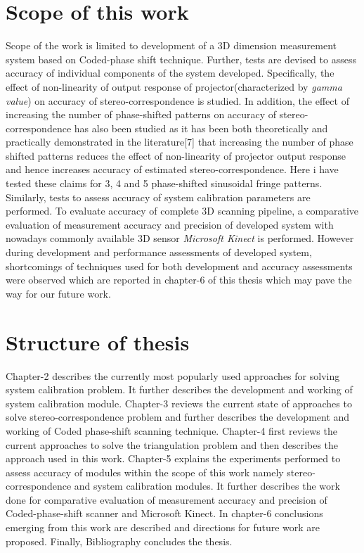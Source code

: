  
 
\section{Scope of this work} 
Scope of the work is limited to development of a 3D dimension measurement system based on Coded-phase shift technique. Further, tests are devised to assess accuracy of individual components of the system developed. Specifically, the effect of non-linearity of output response of projector(characterized by \textit{gamma value}) on accuracy of stereo-correspondence is studied. In addition, the effect of increasing the number of phase-shifted patterns on accuracy of stereo-correspondence has also been studied as it has been both theoretically and practically demonstrated in the literature[7] that increasing the number of phase shifted patterns reduces the effect of non-linearity of projector output response and hence increases accuracy of estimated stereo-correspondence. Here i have tested these claims for 3, 4 and 5 phase-shifted sinusoidal fringe patterns. Similarly, tests to assess accuracy of system calibration parameters are performed. To evaluate accuracy of complete 3D scanning pipeline, a comparative evaluation of measurement accuracy and precision of developed system with nowadays commonly available 3D sensor \textit{Microsoft Kinect} is performed. However during development and performance assessments of developed system, shortcomings of techniques used for both development and accuracy assessments were observed which are reported in chapter-6 of this thesis which may pave the way for our future work.  
 
\section{Structure of thesis} 
Chapter-2 describes the currently most popularly used approaches for solving system calibration problem. It further describes the development and working of system calibration module. Chapter-3 reviews the current state of approaches to solve stereo-correspondence problem and further describes the development and working of Coded phase-shift scanning technique. Chapter-4 first reviews the current approaches to solve the triangulation problem and then describes the approach used in this work. Chapter-5 explains the experiments performed to assess accuracy of modules within the scope of this work namely stereo-correspondence and system calibration modules. It further describes the work done for comparative evaluation of measurement accuracy and precision of Coded-phase-shift scanner and Microsoft Kinect. In chapter-6 conclusions emerging from this work are described and directions for future work are proposed. Finally, Bibliography concludes the thesis.  
 
